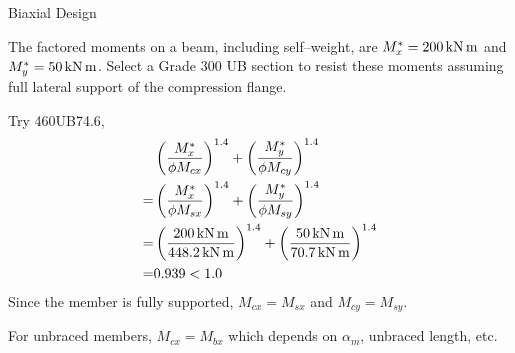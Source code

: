 \begin{exmp}
Biaxial Design

The factored moments on a beam, including self--weight, are $M^*_x=\SI{200}{\kilo\newton\meter}$ and $M^*_y=\SI{50}{\kilo\newton\meter}$. Select a Grade 300 UB section to resist these moments assuming full lateral support of the compression flange.
\end{exmp}
\begin{solution}
Try 460UB74.6,
\begin{align*}
&\left(\dfrac{M^*_x}{\phi{}M_{cx}}\right)^{1.4}+\left(\dfrac{M^*_y}{\phi{}M_{cy}}\right)^{1.4}\\
=&\left(\dfrac{M^*_x}{\phi{}M_{sx}}\right)^{1.4}+\left(\dfrac{M^*_y}{\phi{}M_{sy}}\right)^{1.4}\\
=&\left(\dfrac{\SI{200}{\kilo\newton\meter}}{\SI{448.2}{\kilo\newton\meter}}\right)^{1.4}+\left(\dfrac{\SI{50}{\kilo\newton\meter}}{\SI{70.7}{\kilo\newton\meter}}\right)^{1.4}\\
=&0.939<1.0
\end{align*}
Since the member is fully supported, $M_{cx}=M_{sx}$ and $M_{cy}=M_{sy}$.

For unbraced members, $M_{cx}=M_{bx}$ which depends on $\alpha_m$, unbraced length, etc.
\end{solution}
